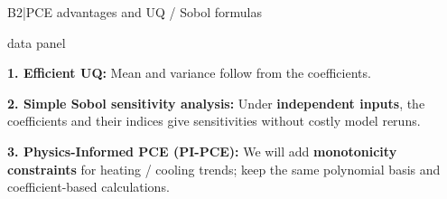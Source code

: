 \begin{frame}[more-space,label=backup-B2]{B2\enspace|\enspace PCE advantages and UQ / Sobol formulas}
  \begin{beamercolorbox}[sep=1.2mm,wd=\textwidth]{data panel}
    \begin{minipage}{\dimexpr\linewidth-2.4mm\relax}
    \footnotesize\raggedright
    \textbf{1. Efficient UQ:} Mean and variance follow from the coefficients.\par
    \textbf{2. Simple Sobol sensitivity analysis:} Under \textbf{independent inputs}, the coefficients and their
    indices give sensitivities without costly model reruns.\par
    \textbf{3. Physics-Informed PCE (PI-PCE):} We will add \textbf{monotonicity constraints} for heating / cooling trends;
    keep the same polynomial basis and coefficient-based calculations.
    \end{minipage}
  \end{beamercolorbox}
  \smallskip
  \setlength{\fboxsep}{2mm}
  \setlength{\fboxrule}{0.5pt}
  \begin{columns}[T,onlytextwidth]
\end{columns}
\end{frame}
